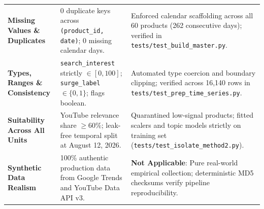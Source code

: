 \documentclass[aspectratio=169, 10pt]{beamer}
\begin{document}
\begin{frame}[t]
\begin{table}[h]
\begin{tabular}{p{2.6cm}p{4.2cm}p{6.0cm}}
                \textbf{Missing Values \& Duplicates} & 0 duplicate keys across \texttt{(product\_id, date)}; 0 missing calendar days. & Enforced calendar scaffolding across all 60 products (262     
  consecutive days); verified in \texttt{tests/test\_build\_master.py}. \\                                                                                                                             
                \addlinespace[2pt]                                                                                                                                                                     
                \textbf{Types, Ranges \& Consistency} & \texttt{search\_interest} strictly $\in [0, 100]$; \texttt{surge\_label} $\in \{0, 1\}$; flags boolean. & Automated type coercion and boundary 
  clipping; verified across 16,140 rows in \texttt{tests/test\_prep\_time\_series.py}. \\                                                                                                              
                \addlinespace[2pt]                                                                                                                                                                     
                \textbf{Suitability Across All Units} & YouTube relevance share $\ge 60\%$; leak-free temporal split at August 12, 2026. & Quarantined low-signal products; fitted scalers and topic   
  models strictly on training set (\texttt{tests/test\_isolate\_method2.py}). \\                                                                                                                       
                \addlinespace[2pt]                                                                                                                                                                     
                \textbf{Synthetic Data Realism} & 100\% authentic production data from Google Trends and YouTube Data API v3. & \textbf{Not Applicable}: Pure real-world empirical collection;         
  deterministic MD5 checksums verify pipeline reproducibility. \\                                                                                                                                      
                \bottomrule                                                                                                                                                                            
            \end{tabular}                                                                                                                                                                              

\end{table}
\end{frame}
\end{document}
